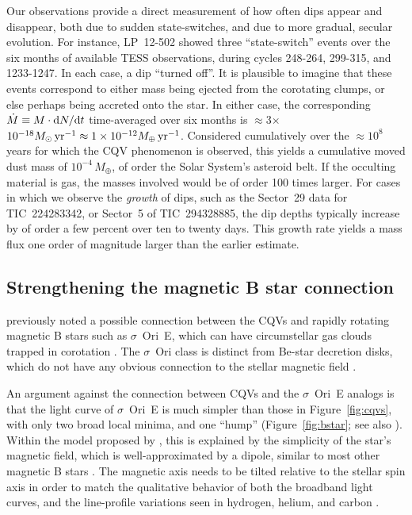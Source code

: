 \documentclass[11pt,twocolumn,tighten]{aastex63}
\begin{document}
Our observations provide a direct measurement of how often dips appear
and disappear, both due to sudden state-switches, and due to more
gradual, secular evolution.  For instance, LP~12-502 showed three
``state-switch'' events over the six months of available TESS
observations, during cycles 248-264, 299-315, and 1233-1247.  In each
case, a dip ``turned off''.  It is plausible to imagine that these
events correspond to either mass being ejected from the corotating
clumps, or else perhaps being accreted onto the star.  In either case,
the corresponding $\dot{M} \equiv M\cdot {\rm d}N/{\rm d}t$
time-averaged over six months is $\approx$3$\times$$10^{-18}
M_\odot\,{\rm yr}^{-1} \approx 1\times10^{-12} M_\oplus\,{\rm
yr}^{-1}$.  Considered cumulatively over the $\approx$$10^8$ years for
which the CQV phenomenon is observed, this yields a cumulative moved
dust mass of $10^{-4}\,M_\oplus$, of order the Solar System's asteroid
belt.  If the occulting material is gas, the masses involved would be
of order 100 times larger.  For cases in which we observe the {\it
growth} of dips, such as the Sector~29 data for TIC~224283342, or
Sector~5 of TIC~294328885, the dip depths typically increase by of
order a few percent over ten to twenty days.  This growth rate yields
a mass flux one order of magnitude larger than the earlier estimate.


\subsection{Strengthening the magnetic B star connection}

\citet{2017AJ....153..152S} previously noted a possible connection
between the CQVs and rapidly rotating magnetic B stars such as
$\sigma$~Ori~E, which can have circumstellar gas clouds trapped in
corotation \citep{2005ApJ...630L..81T}.  The $\sigma$~Ori class is
distinct from Be-star decretion disks, which do not have any obvious
connection to the stellar magnetic field \citep{2013A&ARv..21...69R}.

An argument against the connection between CQVs and the $\sigma$~Ori~E
analogs is that the light curve of $\sigma$~Ori~E is much simpler than
those in Figure~\ref{fig:cqvs}, with only two broad local minima, and
one ``hump'' (Figure~\ref{fig:bstar}; see also
\citealt{2022ApJ...924L..10J}).  Within the model proposed by
\citeauthor{2005ApJ...630L..81T}, this is explained by the simplicity
of the star's magnetic field, which is well-approximated by a dipole,
similar to most other magnetic B stars
\citep{2007A&A...475.1053A,2009ARA&A..47..333D}.  The magnetic axis
needs to be tilted relative to the stellar spin axis in order to match
the qualitative behavior of both the broadband light curves, and the
line-profile variations seen in hydrogen, helium, and carbon
\citep{2012MNRAS.419..959O}.
\end{document}
